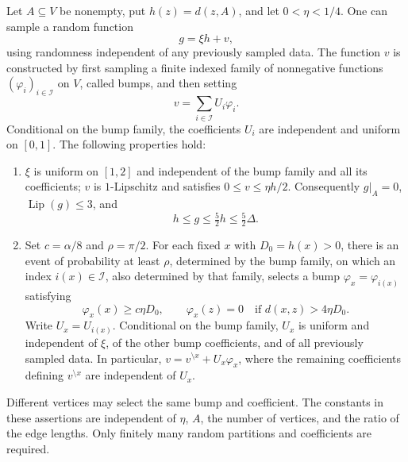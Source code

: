 \begin{lemma}\label{lem:ordinary-noise}
Let $A\subseteq V$ be nonempty, put $h(z)=d(z,A)$, and let
$0<\eta<1/4$. One can sample a random function
\[
  g=\xi h+v,
\]
using randomness independent of any previously sampled data. The
function $v$ is constructed by first sampling a finite indexed family
of nonnegative functions $(\varphi_i)_{i\in\mathcal I}$ on $V$,
called bumps, and then setting
\[
 v=\sum_{i\in\mathcal I}U_i\varphi_i.
\]
Conditional on the bump family, the coefficients
$U_i$ are independent and uniform on $[0,1]$. The following properties
hold:
\begin{enumerate}
\item $\xi$ is uniform on $[1,2]$ and independent of the bump family
      and all its coefficients;
      $v$ is $1$-Lipschitz and satisfies $0\leq v\leq\eta h/2$.
      Consequently $g|_A=0$, $\operatorname{Lip}(g)\leq3$, and
      \[
        h\leq g\leq \tfrac52h\leq\tfrac52\Delta.
      \]
\item Set $c=\alpha/8$ and $\rho=\pi/2$. For each fixed $x$ with
      $D_0=h(x)>0$, there is an event of probability at least $\rho$,
      determined by the bump family, on which an index $i(x)\in\mathcal I$,
      also determined by that family, selects a bump $\varphi_x=\varphi_{i(x)}$ satisfying
      \[
        \varphi_x(x)\geq c\eta D_0,
        \qquad
        \varphi_x(z)=0\quad\text{if }d(x,z)>4\eta D_0.
      \]
      Write $U_x=U_{i(x)}$. Conditional on the bump family, $U_x$ is uniform and independent
      of $\xi$, of the other bump coefficients, and of all previously
      sampled data. In particular,
      $v=v^{\setminus x}+U_x\varphi_x$, where the remaining coefficients
      defining $v^{\setminus x}$ are independent of $U_x$.
\end{enumerate}
Different vertices may select the same bump and coefficient. The
constants in these assertions are independent of $\eta$, $A$, the
number of vertices, and the ratio of the edge lengths. Only finitely many
random partitions and coefficients are required.
\end{lemma}

